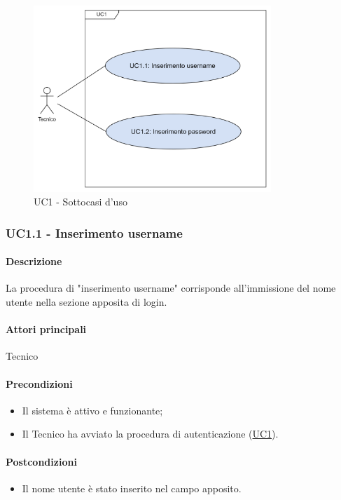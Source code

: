 \begin{figure}[H]
  \centering
  \includegraphics[width=0.80\textwidth]{assets/uc1_1.png}
  \caption{UC1 - Sottocasi d'uso}
\end{figure}


\subsubsection{UC1.1 - Inserimento username}\label{UC1point1}

\paragraph*{Descrizione}
La procedura di "inserimento username" corrisponde all'immissione del nome utente nella sezione apposita di login.

\paragraph*{Attori principali}
Tecnico

\paragraph*{Precondizioni}
\begin{itemize}
  \item Il sistema è attivo e funzionante;
  \item Il Tecnico ha avviato la procedura di autenticazione (\hyperref[UC1]{UC1}).  
\end{itemize}

\paragraph*{Postcondizioni}
\begin{itemize}
  \item Il nome utente è stato inserito nel campo apposito.
\end{itemize}

